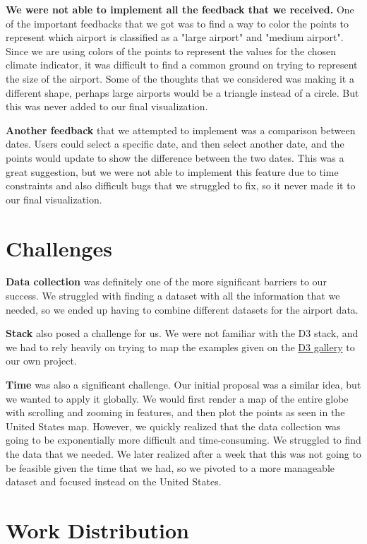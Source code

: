 \documentclass[9pt,twocolumn,twoside]{opticajnl}
\begin{document}
\textbf{We were not able to implement all the feedback that we received.} One of the important feedbacks that we got was to find a way to color the points to represent which airport is classified as a "large airport" and "medium airport". Since we are using colors of the points to represent the values for the chosen climate indicator, it was difficult to find a common ground on trying to represent the size of the airport. Some of the thoughts that we considered was making it a different shape, perhaps large airports would be a triangle instead of a circle. But this was never added to our final visualization.

\textbf{Another feedback} that we attempted to implement was a comparison between dates. Users could select a specific date, and then select another date, and the points would update to show the difference between the two dates. This was a great suggestion, but we were not able to implement this feature due to time constraints and also difficult bugs that we struggled to fix, so it never made it to our final visualization.

\section {Challenges}

\textbf{Data collection} was definitely one of the more significant barriers to our success. We struggled with finding a dataset with all the information that we needed, so we ended up having to combine different datasets for the airport data.

\textbf{Stack} also posed a challenge for us. We were not familiar with the D3 stack, and we had to rely heavily on trying to map the examples given on the \href{https://observablehq.com/@d3/gallery}{D3 gallery} to our own project.

\textbf{Time} was also a significant challenge. Our initial proposal was a similar idea, but we wanted to apply it globally. We would first render a map of the entire globe with scrolling and zooming in features, and then plot the points as seen in the United States map. However, we quickly realized that the data collection was going to be exponentially more difficult and time-consuming. We struggled to find the data that we needed. We later realized after a week that this was not going to be feasible given the time that we had, so we pivoted to a more manageable dataset and focused instead on the United States.

\section {Work Distribution}
\end{document}
